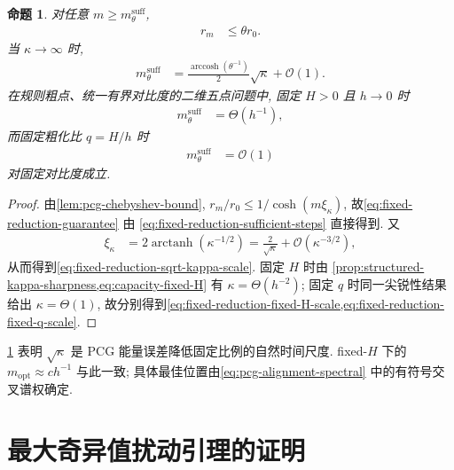 \documentclass{ctexart}
\renewcommand{\O}{\mathcal{O}}
\renewcommand{\ge}{\geqslant}
\renewcommand{\le}{\leqslant}
\DeclareMathOperator{\arccosh}{arccosh}
\newtheorem{proposition}[theorem]{命题}
\begin{document}
\begin{proposition}
\label{prop:fixed-reduction-krylov-scale}
对任意 $m\ge m_{\theta}^{\mathrm{suff}}$,
\begin{align}
    r_m&\le\theta r_0.
    \label{eq:fixed-reduction-guarantee}
\end{align}
当 $\kappa\to\infty$ 时,
\begin{align}
    m_{\theta}^{\mathrm{suff}}
    &=\frac{\arccosh(\theta^{-1})}{2}\sqrt\kappa+\O(1).
    \label{eq:fixed-reduction-sqrt-kappa-scale}
\end{align}
在规则粗点、统一有界对比度的二维五点问题中, 固定 $H>0$ 且 $h\to0$ 时
\begin{align}
    m_{\theta}^{\mathrm{suff}}&=\Theta(h^{-1}),
    \label{eq:fixed-reduction-fixed-H-scale}
\end{align}
而固定粗化比 $q=H/h$ 时
\begin{align}
    m_{\theta}^{\mathrm{suff}}&=\O(1)
    \label{eq:fixed-reduction-fixed-q-scale}
\end{align}
对固定对比度成立.
\end{proposition}

\begin{proof}
由\cref{lem:pcg-chebyshev-bound},
$r_m/r_0\le1/\cosh(m\xi_\kappa)$,
故\cref{eq:fixed-reduction-guarantee} 由
\cref{eq:fixed-reduction-sufficient-steps} 直接得到.
又
\begin{align}
    \xi_\kappa
    &=2\operatorname{arctanh}(\kappa^{-1/2})
      =\frac2{\sqrt\kappa}+\O(\kappa^{-3/2}),
    \label{eq:fixed-reduction-xi-asymptotic}
\end{align}
从而得到\cref{eq:fixed-reduction-sqrt-kappa-scale}.
固定 $H$ 时由
\cref{prop:structured-kappa-sharpness,eq:capacity-fixed-H}
有 $\kappa=\Theta(h^{-2})$;
固定 $q$ 时同一尖锐性结果给出 $\kappa=\Theta(1)$,
故分别得到\cref{eq:fixed-reduction-fixed-H-scale,eq:fixed-reduction-fixed-q-scale}.
\end{proof}

\cref{prop:fixed-reduction-krylov-scale} 表明 $\sqrt\kappa$ 是 PCG 能量误差降低固定比例的自然时间尺度. fixed-$H$ 下的 $m_{\mathrm{opt}}\approx c h^{-1}$ 与此一致; 具体最佳位置由\cref{eq:pcg-alignment-spectral} 中的有符号交叉谱权确定.

\appendix

\section{最大奇异值扰动引理的证明}
\label{app:sv-perturbation-proof}
\end{document}
